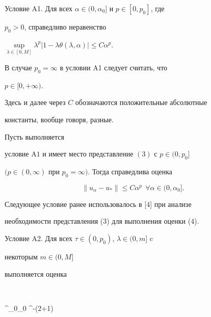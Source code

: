 {Условие A1.} Для всех $\alpha\in(0,\alpha_0]$ и $p\in[0,p_0]$, где 


$p_0>0$, справедливо неравенство\linebreak


$\sup\limits_{\lambda\in[0,M]}\lambda^p|1-\lambda\theta 


(\lambda,\alpha)|\le C\alpha^p$. 


\medskip 


 


В случае $p_0=\infty$ в условии A1 следует считать, что 


$p\in[0,+\infty)$. 


Здесь и далее через $C$ обозначаются положительные абсолютные 


константы, вообще говоря, разные. 


 


\begin{prop} 


Пусть выполняется 


условие $\mathrm A1$ и имеет место представление $(3)$ с $p\in(0,p_0]$ 


$(p\in(0,\infty)$ при $p_0=\infty)$. Тогда справедлива оценка 


\begin{equation} 


\|u_\alpha-u_*\|\le C\alpha^p\ \ \forall\alpha\in(0,\alpha_0]. 


\end{equation} 


\end{prop} 


 


Следующее условие ранее использовалось в [4] при анализе 


необходимости представления (3) для выполнения оценки (4). 


\medskip 


 


Условие A2. Для всех $\tau\in(0,p_0)$, $\lambda\in(0,m]$ c 


некоторым $m\in(0,M]$ 


выполняется оценка 


$$ 


\int^{\alpha_0}_0 \alpha^{-(2\tau+1)} 


